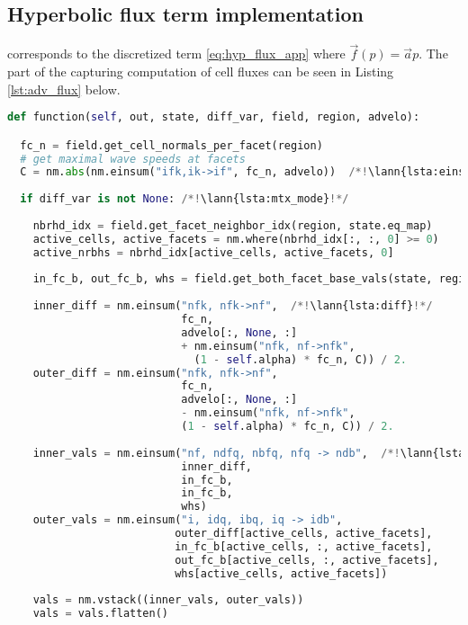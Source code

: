 \subsection{Hyperbolic flux term implementation}
\label{se:adv_flux_term_imp}
 corresponds to the discretized term \eqref{eq:hyp_flux_app}
where $\vec{f}(p) = \vec{a}p$. The part of the  capturing computation of
cell fluxes can be seen in Listing \ref{lst:adv_flux} below.
\setcounter{lstannotation}{0}
\begin{lstlisting}[language=Python, caption=Computation of advection cell
fluxes. \label{lst:adv_flux}]
def function(self, out, state, diff_var, field, region, advelo):

  fc_n = field.get_cell_normals_per_facet(region)
  # get maximal wave speeds at facets
  C = nm.abs(nm.einsum("ifk,ik->if", fc_n, advelo))  /*!\lann{lsta:einsm}!*/
    
  if diff_var is not None: /*!\lann{lsta:mtx_mode}!*/
  
    nbrhd_idx = field.get_facet_neighbor_idx(region, state.eq_map)
    active_cells, active_facets = nm.where(nbrhd_idx[:, :, 0] >= 0)
    active_nrbhs = nbrhd_idx[active_cells, active_facets, 0]
    
    in_fc_b, out_fc_b, whs = field.get_both_facet_base_vals(state, region)
    
    inner_diff = nm.einsum("nfk, nfk->nf",  /*!\lann{lsta:diff}!*/
                           fc_n,
                           advelo[:, None, :]
                           + nm.einsum("nfk, nf->nfk",
                             (1 - self.alpha) * fc_n, C)) / 2.
    outer_diff = nm.einsum("nfk, nfk->nf",
                           fc_n,
                           advelo[:, None, :]
                           - nm.einsum("nfk, nf->nfk",
                           (1 - self.alpha) * fc_n, C)) / 2.
    
    inner_vals = nm.einsum("nf, ndfq, nbfq, nfq -> ndb",  /*!\lann{lsta:vals}!*/
                           inner_diff,
                           in_fc_b,
                           in_fc_b,
                           whs)
    outer_vals = nm.einsum("i, idq, ibq, iq -> idb",
                          outer_diff[active_cells, active_facets],
                          in_fc_b[active_cells, :, active_facets],
                          out_fc_b[active_cells, :, active_facets],
                          whs[active_cells, active_facets])
    
    vals = nm.vstack((inner_vals, outer_vals))
    vals = vals.flatten()
    

\end{lstlisting}
